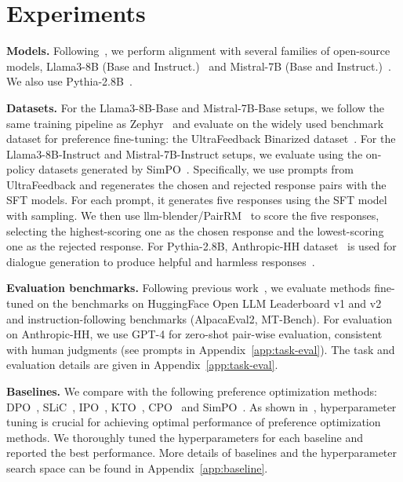 

\section{Experiments}
\label{sec:exp}
\textbf{Models.} Following~\citep{meng2024simpo}, we perform alignment with several families of open-source models, Llama3-8B (Base and Instruct.)~\citep{dubey2024llama} and Mistral-7B (Base and Instruct.)~\citep{jiang2023mistral}. We also use  Pythia-2.8B~\citep{biderman2023pythia,rafailov2024direct}.

\textbf{Datasets.} For the Llama3-8B-Base and Mistral-7B-Base setups, we follow the same training pipeline as Zephyr~\citep{tunstall2023zephyr} and evaluate \method on the widely used benchmark dataset for preference fine-tuning: the UltraFeedback Binarized dataset~\citep{cui2023ultrafeedback,tunstall2023zephyr}. For the Llama3-8B-Instruct and Mistral-7B-Instruct setups, we evaluate using the on-policy datasets generated by SimPO~\citep{meng2024simpo}. Specifically, we use prompts from  UltraFeedback and regenerates the chosen and rejected response pairs with the SFT models. For each prompt, it generates five responses using the SFT model with sampling. We then use llm-blender/PairRM~\citep{jiang2023llm} to score the five responses, selecting the highest-scoring one as the chosen response and the lowest-scoring one as the rejected response. For Pythia-2.8B, Anthropic-HH dataset~\citep{bai2022training} is used for dialogue generation to produce helpful and harmless responses~\citep{rafailov2024direct}. 


\textbf{Evaluation benchmarks.} Following previous work~\citep{rafailov2024direct,tunstall2023zephyr}, we evaluate methods fine-tuned on the  benchmarks on HuggingFace Open LLM Leaderboard v1 and v2~\citep{eval-harness} and instruction-following benchmarks (AlpacaEval2, MT-Bench). For evaluation on Anthropic-HH, we use GPT-4 for zero-shot pair-wise evaluation,
consistent with human judgments (see prompts in Appendix~\ref{app:task-eval}).  The task and evaluation details are given in Appendix~\ref{app:task-eval}. 







\textbf{Baselines.} 
We compare \method with the following preference optimization methods: DPO~\citep{rafailov2024direct}, SLiC~\citep{zhao2023slic},  IPO~\citep{azar2024general}, KTO~\citep{ethayarajh2024kto}, CPO~\citep{xucontrastive} and SimPO~\citep{meng2024simpo}.  As shown in~\citep{meng2024simpo},  hyperparameter tuning is crucial for achieving optimal performance of preference optimization methods. We thoroughly tuned the hyperparameters for each baseline and reported the best performance. More details of baselines and the hyperparameter search space can be found in Appendix~\ref{app:baseline}.  


